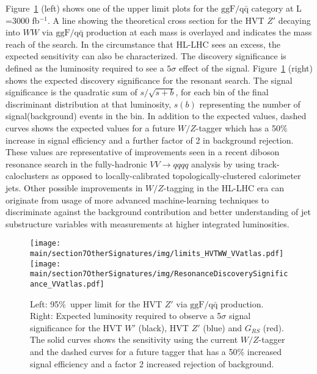 Figure~\ref{fig:Limits_VVatlas} (left) shows one of the upper limit plots for the $\mathrm{ggF/q\bar{q}}$ category at L =3000 fb$^{-1}$.   
A line showing the theoretical cross section for the HVT $Z'$ decaying into $WW$ via $\mathrm{ggF/q\bar{q}}$ 
production at each mass is overlayed and indicates the mass reach of the search.
In the circumstance that HL-LHC sees an excess, the expected sensitivity can also be characterized.  
The discovery significance is defined as the luminosity required to see a $5\sigma$ effect of the signal. 
Figure~\ref{fig:Limits_VVatlas} (right) shows the expected discovery significance for the resonant search. 
The signal significance is the quadratic sum of $s/\sqrt{s+b}$, for each bin of the final discriminant distribution at that luminosity, 
$s(b)$ representing the number of signal(background) events in the bin.
In addition to the expected values, dashed curves shows the expected values for a future $W/Z$-tagger which has a 50\% increase 
in signal efficiency and a further factor of 2 in background rejection. 
These values are representative of improvements seen in a recent diboson resonance search in the fully-hadronic $VV \rightarrow qqqq$ 
analysis by using track-caloclusters as opposed to locally-calibrated topologically-clustered calorimeter jets.
Other possible improvements in $W/Z$-tagging in the HL-LHC era can originate from usage of more advanced machine-learning techniques to discriminate 
against the background contribution and better understanding of jet substructure variables with measurements at higher integrated luminosities.

\begin{figure}[!ht]
\begin{centering}
    \texttt{[image: \\main/section7OtherSignatures/img/limits\_HVTWW\_VVatlas.pdf]}
    \texttt{[image: \\main/section7OtherSignatures/img/ResonanceDiscoverySignificance\_VVatlas.pdf]}
    \caption{Left: 95\%~\cl upper limit for the HVT $Z'$ via $\mathrm{ggF/q\bar{q}}$ production. Right: Expected luminosity required to observe a 5$\sigma$ signal significance for the HVT $W'$ (black), HVT $Z'$ (blue) and $G_{RS}$ (red). The solid curves shows the sensitivity using the current $W/Z$-tagger and the dashed curves for a future tagger that has a 50\% increased signal efficiency and a factor 2 increased rejection of background.}
    \label{fig:Limits_VVatlas}
\end{centering}
\end{figure}

